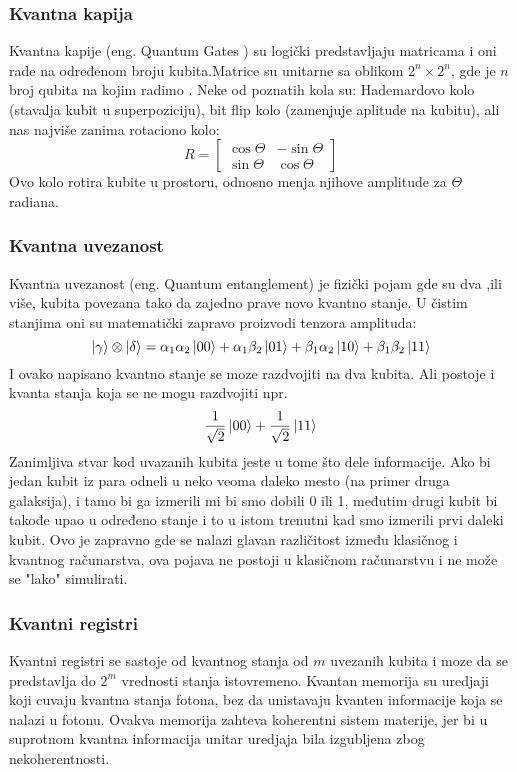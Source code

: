 \documentclass[12pt, letterpaper, oneside]{article}
\begin{document}
\subsubsection*{Kvantna kapija}
Kvantna kapije (eng. Quantum Gates ) su logički predstavljaju matricama i oni rade na određenom broju kubita.Matrice su unitarne sa oblikom $2^n \times 2^n$, gde je $n$ broj qubita na kojim radimo . Neke od poznatih kola su: Hademardovo kolo (stavalja kubit u superpoziciju), bit flip kolo (zamenjuje aplitude na kubitu), ali nas najviše zanima rotaciono kolo:
\[
    R = \begin{bmatrix}
        \cos{\Theta} & -\sin{\Theta} \\
        \sin{\Theta} & \cos{\Theta} 
    \end{bmatrix}
\]
Ovo kolo rotira kubite u prostoru, odnosno menja njihove amplitude za $\Theta$ radiana.
\subsubsection*{Kvantna uvezanost}
Kvantna uvezanost (eng. Quantum entanglement) je fizički pojam gde su dva ,ili više, kubita povezana tako da zajedno prave novo kvantno stanje.
U čistim stanjima oni su matematički zapravo proizvodi tenzora amplituda:
\[
    \ket{\gamma} \otimes \ket{\delta} = \alpha_1\alpha_2\ket{00} + \alpha_1\beta_2\ket{01} + \beta_1\alpha_2\ket{10} + \beta_1\beta_2\ket{11}
\]
I ovako napisano kvantno stanje se moze razdvojiti na dva kubita. Ali postoje i kvanta stanja koja se ne mogu razdvojiti npr.
\[
 \frac{1}{\sqrt{2}}\ket{00} + \frac{1}{\sqrt{2}}\ket{11}
\]
Zanimljiva stvar kod uvazanih kubita jeste u tome što dele informacije. Ako bi jedan kubit iz para odneli u neko veoma daleko mesto (na primer druga galaksija), i tamo bi ga izmerili mi bi smo dobili 0 ili 1, međutim drugi kubit bi takođe upao u određeno stanje i to u istom trenutni kad smo izmerili prvi daleki kubit. Ovo je zapravno gde se nalazi glavan različitost između klasičnog i kvantnog računarstva, ova pojava ne postoji u klasičnom računarstvu i ne može se "lako" simulirati.
\subsubsection*{Kvantni registri}
Kvantni registri se sastoje od kvantnog stanja od $m$ uvezanih kubita i moze da se predstavlja do $2^m$ vrednosti stanja istovremeno.
Kvantan memorija su uredjaji koji cuvaju kvantna stanja fotona, bez da unistavaju kvanten informacije koja se nalazi u fotonu.
Ovakva memorija zahteva koherentni sistem materije, jer bi u suprotnom kvantna informacija unitar uredjaja bila izgubljena zbog nekoherentnosti.
\end{document}
